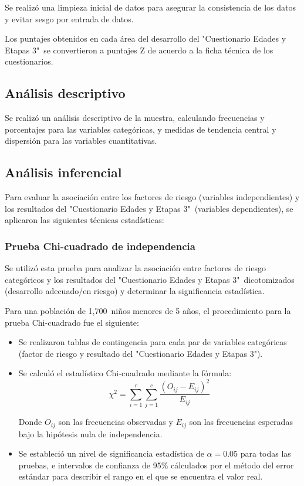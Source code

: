 \documentclass[11pt,letterpaper]{report}
\newcommand{\muestradeseada}{1,700}
\newcommand{\asq}{"Cuestionario Edades y Etapas 3"}
\begin{document}
Se realizó una limpieza inicial de datos para asegurar la consistencia de los
datos y evitar sesgo por entrada de datos.

Los puntajes obtenidos en cada área del desarrollo del \asq\ se convertieron a
puntajes Z de acuerdo a la ficha técnica de los cuestionarios. 
	
\subsection{Análisis descriptivo}
Se realizó un análisis descriptivo de la muestra, calculando frecuencias y
porcentajes para las variables categóricas, y medidas de tendencia central y
dispersión para las variables cuantitativas.

\subsection{Análisis inferencial}
Para evaluar la asociación entre los factores de riesgo (variables
independientes) y los resultados del \asq\ (variables dependientes), se
aplicaron las siguientes técnicas estadísticas:

\subsubsection{Prueba Chi-cuadrado de independencia}
Se utilizó esta prueba para analizar la asociación entre factores de riesgo
categóricos y los resultados del \asq\ dicotomizados (desarrollo adecuado/en
riesgo) y determinar la significancia estadística.

Para una población de \muestradeseada\ niños menores de 5 años, el
procedimiento para la prueba Chi-cuadrado fue el siguiente:

\begin{itemize}
    \item Se realizaron tablas de contingencia para cada par de variables
		categóricas (factor de riesgo y resultado del \asq).
    
    \item Se calculó el estadístico Chi-cuadrado mediante la fórmula:
    \[
    \chi^2 = \sum_{i=1}^r \sum_{j=1}^c \frac{(O_{ij} - E_{ij})^2}{E_{ij}}
    \]
    
    Donde \( O_{ij} \) son las frecuencias observadas y \( E_{ij} \) son las
	frecuencias esperadas bajo la hipótesis nula de independencia.
    
    \item Se estableció un nivel de significancia estadística de $\alpha = 0.05$
		para todas las pruebas, e intervalos de confianza de 95\% cálculados
		por el método del error estándar para describir el rango en el que se
		encuentra el valor real.
\end{itemize}
\end{document}
